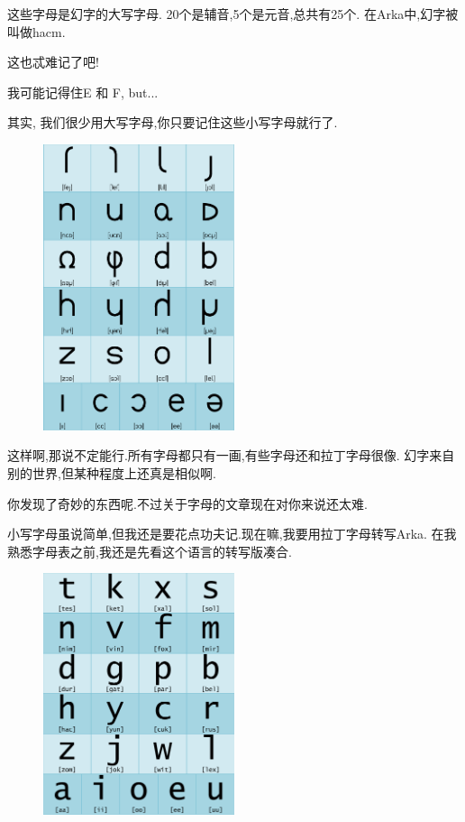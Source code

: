 这些字母是幻字的大写字母.
20个是辅音,5个是元音,总共有25个.
在Arka中,幻字被叫做hacm.


这也忒难记了吧!

我可能记得住E 和 F, but...


其实, 我们很少用大写字母,你只要记住这些小写字母就行了.
\begin{figure}[H]
\includegraphics[width=0.5\textwidth]{ARKA/lemal.png}
\end{figure}

这样啊,那说不定能行.所有字母都只有一画,有些字母还和拉丁字母很像.
幻字来自别的世界,但某种程度上还真是相似啊.


你发现了奇妙的东西呢.不过关于字母的文章现在对你来说还太难.


小写字母虽说简单,但我还是要花点功夫记.现在嘛,我要用拉丁字母转写Arka.
在我熟悉字母表之前,我还是先看这个语言的转写版凑合.
\begin{figure}[H]
\includegraphics[width=0.5\textwidth]{ARKA/tenxa.png}
\end{figure}

